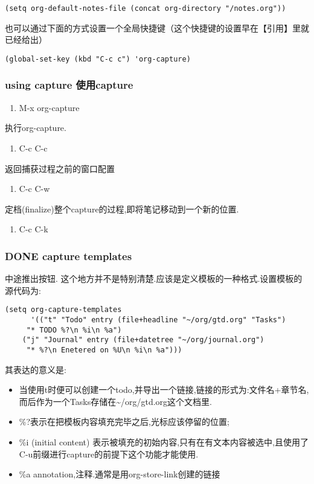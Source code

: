 \documentclass[10pt,a4paper]{article}
\begin{document}
\begin{verbatim}
(setq org-default-notes-file (concat org-directory "/notes.org"))
\end{verbatim}
也可以通过下面的方式设置一个全局快捷键（这个快捷键的设置早在【引用】里就已经给出）

\begin{verbatim}
(global-set-key (kbd "C-c c") 'org-capture)
\end{verbatim}
\subsubsection{using capture 使用capture}
\label{sec:org8e3f7e3}
\begin{enumerate}
\item M-x org-capture
\end{enumerate}
执行org-capture.

\begin{enumerate}
\item C-c C-c
\end{enumerate}
返回捕获过程之前的窗口配置

\begin{enumerate}
\item C-c C-w
\end{enumerate}
定档(finalize)整个capture的过程,即将笔记移动到一个新的位置.

\begin{enumerate}
\item C-c C-k
\end{enumerate}
\subsubsection{{\bfseries\sffamily DONE} capture templates}
\label{sec:orgc256b6c}
 中途推出按钮.
这个地方并不是特别清楚.应该是定义模板的一种格式.设置模板的源代码为:
\begin{verbatim}
(setq org-capture-templates
      '(("t" "Todo" entry (file+headline "~/org/gtd.org" "Tasks")
	 "* TODO %?\n %i\n %a")
	("j" "Journal" entry (file+datetree "~/org/journal.org")
	 "* %?\n Enetered on %U\n %i\n %a")))
\end{verbatim}
其表达的意义是:
\begin{itemize}
\item 当使用t时便可以创建一个todo,并导出一个链接,链接的形式为:文件名+章节名,而后作为一个Tasks存储在\textasciitilde{}/org/gtd.org这个文档里.
\item \%?表示在把模板内容填充完毕之后,光标应该停留的位置;
\item \%i (initial content) 表示被填充的初始内容,只有在有文本内容被选中,且使用了C-u前缀进行capture的前提下这个功能才能使用.
\item \%a annotation,注释.通常是用org-store-link创建的链接
\end{itemize}
\end{document}

